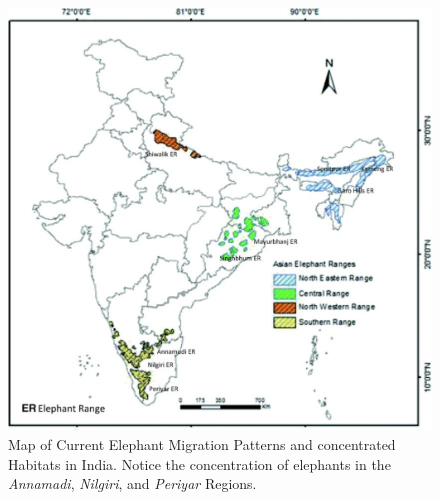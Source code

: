 \begin{figure}
    \centering
    \includegraphics[width=0.9\columnwidth]{figures/Elephant-ranging-areas-in-India.pdf}
    \caption{Map of Current Elephant Migration Patterns and concentrated Habitats in India. Notice the concentration of elephants in the \textit{Annamadi}, \textit{Nilgiri}, and \textit{Periyar} Regions.}
    \label{fig:elephantmap}
\end{figure}